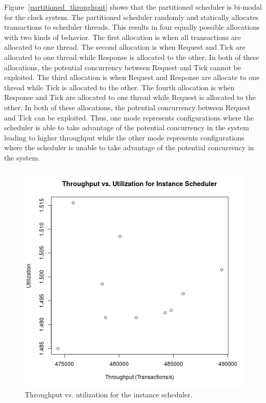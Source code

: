 Figure~\ref{partitioned_throughput} shows that the partitioned scheduler is bi-modal for the clock system.
The partitioned scheduler randomly and statically allocates transactions to scheduler threads.
This results in four equally possible allocations with two kinds of behavior.
The first allocation is when all transactions are allocated to one thread.
The second allocation is when Request and Tick are allocated to one thread while Response is allocated to the other.
In both of these allocations, the potential concurrency between Request and Tick cannot be exploited.
The third allocation is when Request and Response are allocate to one thread while Tick is allocated to the other.
The fourth allocation is when Response and Tick are allocated to one thread while Request is allocated to the other.
In both of these allocations, the potential concurrency between Request and Tick can be exploited.
Thus, one mode represents configurations where the scheduler is able to take advantage of the potential concurrency in the system leading to higher throughput while the other mode represents configurations where the scheduler is unable to take advantage of the potential concurrency in the system.

\begin{figure}
\center
\includegraphics[width=\textwidth]{instance_throughput_utilization.png}
\caption{Throughput vs. utilization for the instance scheduler. \label{instance_throughput_utilization}}
\end{figure}

